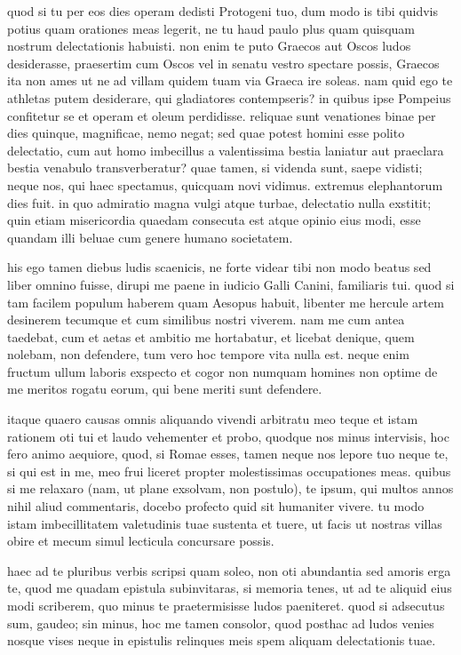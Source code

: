  quod si tu per eos dies operam dedisti Protogeni tuo, dum modo is tibi quidvis potius quam orationes meas legerit, ne tu haud paulo plus quam quisquam nostrum delectationis habuisti. non enim te puto Graecos aut Oscos ludos desiderasse, praesertim cum Oscos vel in senatu vestro spectare possis, Graecos ita non ames ut ne ad villam quidem tuam via Graeca ire soleas. nam quid ego te athletas putem desiderare, qui gladiatores contempseris? in quibus ipse Pompeius confitetur se et operam et oleum perdidisse. reliquae sunt venationes binae per dies quinque, magnificae, nemo negat; sed quae potest homini esse polito delectatio, cum aut homo imbecillus a valentissima bestia laniatur aut praeclara bestia venabulo transverberatur? quae tamen, si videnda sunt, saepe vidisti; neque nos, qui haec spectamus, quicquam novi vidimus. extremus elephantorum dies fuit. in quo admiratio magna vulgi atque turbae, delectatio nulla exstitit; quin etiam misericordia quaedam consecuta est atque opinio eius modi, esse quandam illi beluae cum genere humano societatem.

 his ego tamen diebus ludis scaenicis, ne forte videar tibi non modo beatus sed liber omnino fuisse, dirupi me paene in iudicio Galli Canini, familiaris tui. quod si tam facilem populum haberem quam Aesopus habuit, libenter me hercule artem desinerem tecumque et cum similibus nostri viverem. nam me cum antea taedebat, cum et aetas et ambitio me hortabatur, et licebat denique, quem nolebam, non defendere, tum vero hoc tempore vita nulla est. neque enim fructum ullum laboris exspecto et cogor non numquam homines non optime de me meritos rogatu eorum, qui bene meriti sunt defendere.

 itaque quaero causas omnis aliquando vivendi arbitratu meo teque et istam rationem oti tui et laudo vehementer et probo, quodque nos minus intervisis, hoc fero animo aequiore, quod, si Romae esses, tamen neque nos lepore tuo neque te, si qui est in me, meo frui liceret propter molestissimas occupationes meas. quibus si me relaxaro (nam, ut plane exsolvam, non postulo), te ipsum, qui multos annos nihil aliud commentaris, docebo profecto quid sit humaniter vivere. tu modo istam imbecillitatem valetudinis tuae sustenta et tuere, ut facis ut nostras villas obire et mecum simul lecticula concursare possis.

 haec ad te pluribus verbis scripsi quam soleo, non oti abundantia sed amoris erga te, quod me quadam epistula subinvitaras, si memoria tenes, ut ad te aliquid eius modi scriberem, quo minus te praetermisisse ludos paeniteret. quod si adsecutus sum, gaudeo; sin minus, hoc me tamen consolor, quod posthac ad ludos venies nosque vises neque in epistulis relinques meis spem aliquam delectationis tuae.
